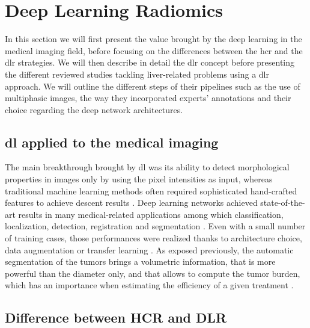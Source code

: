 \section{Deep Learning Radiomics}\label{deep-learning-radiomics}

In this section we will first present the value brought by the deep learning in the medical imaging field, before focusing on the differences between the
\ac{hcr} and the \ac{dlr} strategies. We will then describe in detail
the \ac{dlr} concept before presenting the different reviewed
studies tackling liver-related problems using a \ac{dlr} approach. We
will outline the different steps of their pipelines such as the use of
multiphasic images, the way they incorporated experts' annotations and
their choice regarding the deep network architectures.

\subsection{\ac{dl} applied to the medical imaging}

The main breakthrough brought by \ac{dl} was its ability to detect
morphological properties in images only by using the pixel intensities
as input, whereas traditional machine learning methods often required
sophisticated hand-crafted features to achieve descent results \cite{Litjens2017, Suzuki2017}. Deep learning networks achieved
state-of-the-art results in many medical-related applications among
which classification, localization, detection, registration and
segmentation \cite{Ker2017}. Even with a small number of
training cases, those performances were realized thanks to architecture
choice, data augmentation or transfer learning \cite{Zheng2018, Hu2018}.
As exposed previously, the automatic segmentation of the tumors brings a
volumetric information, that is more powerful than the diameter only,
and that allows to compute the tumor burden, which has an importance
when estimating the efficiency of a given treatment \cite{Gobbi2004, Bornemann2007, Heussel2007, Kuhnigk2006, Puesken2010, Bauknecht2010}.\\

\subsection{Difference between HCR and DLR}\label{difference-between-hcr-and-dlr}

